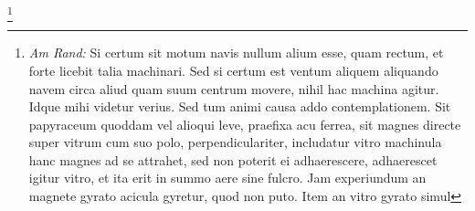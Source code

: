 \footnote{\textit{Am Rand:} Si certum sit motum navis\protect{} nullum alium esse, quam rectum, et  forte licebit talia machinari. Sed si certum est ventum aliquem aliquando navem\protect{} circa aliud quam suum centrum movere, nihil hac machina agitur. Idque mihi videtur verius. Sed tum animi causa addo contemplationem. Sit papyraceum quoddam vel alioqui leve, praefixa acu ferrea, sit magnes\protect{} directe super vitrum cum suo polo\protect{}, perpendiculariter, includatur vitro machinula hanc magnes\protect{} ad se attrahet, sed non poterit ei adhaerescere, adhaerescet igitur vitro, et ita erit in summo aere sine fulcro.
Jam experiundum an magnete gyrato acicula gyretur, quod non puto. Item an vitro gyrato simul
}
